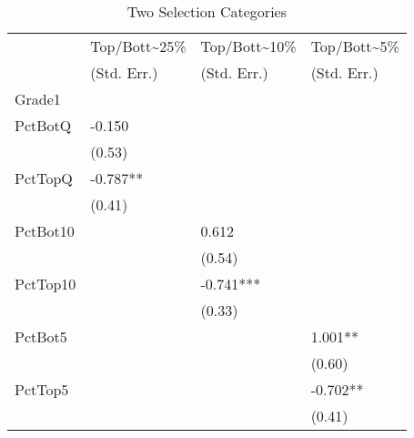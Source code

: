 \begin{table}[!htbp]
  \centering
  \begin{threeparttable}
    \caption{Two Selection Categories}\label{tab:2sc}
    \begin{tabular}{l l l l} 
      \hline
      \hline
               & Top/Bott{\textasciitilde}25\% & Top/Bott{\textasciitilde}10\% & Top/Bott{\textasciitilde}5\% \\
               & (Std. Err.)                   & (Std. Err.)                   & (Std. Err.)                  \\
      \hline
      Grade1   &                               &                               &                              \\
      PctBotQ  & -0.150                        &                               &                              \\
               & (0.53)                        &                               &                              \\
      PctTopQ  & -0.787**                      &                               &                              \\
               & (0.41)                        &                               &                              \\
      PctBot10 &                               & 0.612                         &                              \\
               &                               & (0.54)                        &                              \\
      PctTop10 &                               & -0.741***                     &                              \\
               &                               & (0.33)                        &                              \\
      PctBot5  &                               &                               & 1.001**                      \\
               &                               &                               & (0.60)                       \\
      PctTop5  &                               &                               & -0.702**                     \\
               &                               &                               & (0.41)                       \\
      \hline

\end{tabular}
\end{threeparttable}
\end{table}
